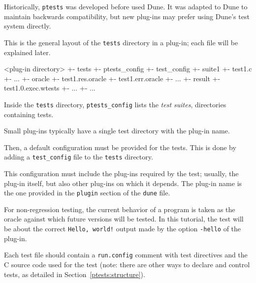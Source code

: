 \begin{important}
  Historically, \texttt{ptests} was developed before \framac used Dune. It was
  adapted to Dune to maintain backwards compatibility, but new plug-ins may
  prefer using Dune's test system directly.
\end{important}

This is the general layout of the \texttt{tests} directory in a \framac
plug-in; each file will be explained later.

\begin{logs}[breaklines=true]
<plug-in directory>
+- tests
   +- ptests_config
   +- test_config
   +- suite1
      +- test1.c
      +- ...
      +- oracle
         +- test1.res.oracle
         +- test1.err.oracle
         +- ...
      +- result
         +- test1.0.exec.wtests
         +- ...
  +- ...
\end{logs}

Inside the \texttt{tests} directory, \verb|ptests_config| lists the
{\em test suites}, \ie directories containing tests.


Small plug-ins typically have a single test directory with the plug-in name.

Then, a default configuration must be provided for the tests. This is done by
adding a \texttt{test\_config} file to the \texttt{tests} directory.


This configuration must include the plug-ins required by the test; usually, the
plug-in itself, but also other plug-ins on which it depends. The plug-in name
is the one provided in the \texttt{plugin} section of the \texttt{dune} file.

For non-regression testing, the current behavior of a program is taken as
the oracle against which future versions will be tested. In this tutorial, the
test will be about the correct \texttt{Hello, world!} output made by the option
\texttt{-hello} of the plug-in.

Each test file should contain a
\texttt{run.config}
comment with test directives and the C
source code used for the test (note: there are other ways to declare and
control tests, as detailed in Section~\ref{ptests:structure}).

